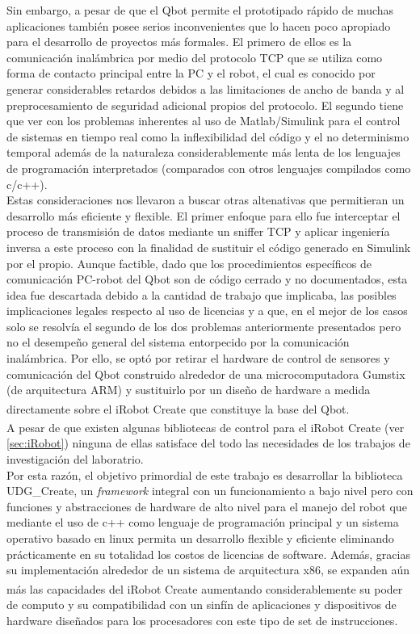 \documentclass[letterpaper,openright,12pt]{book}
\begin{document}
Sin embargo, a pesar de que el Qbot permite el prototipado rápido de muchas aplicaciones también posee serios inconvenientes que lo hacen poco apropiado para el desarrollo de proyectos más formales. El primero de ellos es la comunicación inalámbrica por medio del protocolo TCP que se utiliza como forma de contacto principal entre la PC y el robot, el cual es conocido por generar considerables retardos debidos a las limitaciones de ancho de banda y al preprocesamiento de seguridad adicional propios del protocolo\cite{nilsson}. El segundo tiene que ver con los problemas inherentes al uso de Matlab/Simulink para el control de sistemas en tiempo real como la inflexibilidad del código\cite{sjostedt} y el no determinismo temporal\cite{henriksson} además de la naturaleza considerablemente más lenta de los lenguajes de programación interpretados (comparados con otros lenguajes compilados como c/c++).\\
Estas consideraciones nos llevaron a buscar otras altenativas que permitieran un desarrollo más eficiente y flexible. El primer enfoque para ello fue interceptar el proceso de transmisión de datos mediante un sniffer TCP y aplicar ingeniería inversa a este proceso con la finalidad de sustituir el código generado en Simulink por el propio. Aunque factible, dado que los procedimientos específicos de comunicación PC-robot del Qbot son de código cerrado y no documentados, esta idea fue descartada debido a la cantidad de trabajo que implicaba, las posibles implicaciones legales respecto al uso de licencias y a que, en el mejor de los casos solo se resolvía el segundo de los dos problemas anteriormente presentados pero no el desempeño general del sistema entorpecido por la comunicación inalámbrica.
Por ello, se optó por retirar el hardware de control de sensores y comunicación del Qbot construido alrededor de una microcomputadora Gumstix (de arquitectura ARM) y sustituirlo por un diseño de hardware a medida directamente sobre el iRobot Create\textsuperscript{\textregistered} que constituye la base del Qbot.\\
A pesar de que existen algunas bibliotecas de control para el iRobot Create\textsuperscript{\textregistered} (ver \ref{sec:iRobot}) ninguna de ellas satisface del todo las necesidades de los trabajos de investigación del laboratrio.\\
Por esta razón, el objetivo primordial de este trabajo es desarrollar la biblioteca UDG\_Create, un \emph{framework} integral con un funcionamiento a bajo nivel pero con funciones y abstracciones de hardware de alto nivel para el manejo del robot que mediante el uso de c++ como lenguaje de programación principal y un sistema operativo basado en linux permita un desarrollo flexible y eficiente eliminando prácticamente en su totalidad los costos de licencias de software. Además, gracias su implementación alrededor de un sistema de arquitectura x86, se expanden aún más las capacidades del iRobot Create\textsuperscript{\textregistered} aumentando considerablemente su poder de computo y su compatibilidad con un sinfín de aplicaciones y dispositivos de hardware diseñados para los procesadores con este tipo de set de instrucciones.\\
\end{document}
